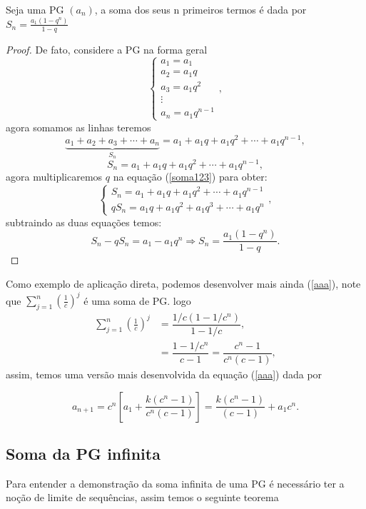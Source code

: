 \begin{teo}
\label{teoPG}
Seja uma PG $(a_n)$, a soma dos seus n primeiros termos é dada por $\displaystyle S_n = \frac{a_1(1-q^{n})}{1-q}$
\end{teo}
\begin{proof}
De fato, considere a PG na forma geral
\begin{equation}
    \begin{cases}
    a_1 = a_1\\
    a_2 = a_1q\\
    a_3 = a_1q^2\\
    \vdots\\
    a_n = a_1q^{n-1}
    \end{cases},
\end{equation}
agora somamos as linhas teremos
$$\underbrace{a_1 + a_2 + a_3 + \cdots + a_n}_{S_n} = a_1 + a_1q + a_1q^2 + \cdots +a_1q^{n-1},$$
\begin{equation}
\label{soma123}
S_n = a_1 + a_1q + a_1q^2 + \cdots + a_1q^{n-1},
\end{equation}
agora multiplicaremos $q$ na equação (\ref{soma123}) para obter:
\begin{equation}
    \begin{cases}
    S_n = a_1 + a_1q + a_1q^2 + \cdots + a_1q^{n-1}\\
    qS_n = a_1q + a_1q^2 + a_1q^3 + \cdots + a_1q^{n}
    \end{cases},
\end{equation}
subtraindo as duas equações temos:
$$S_n - qS_n = a_1 - a_1q^n \Rightarrow S_n =  \frac{a_1(1-q^{n})}{1-q}.$$
\end{proof}
Como exemplo de aplicação direta, podemos desenvolver mais ainda  (\ref{aaa}), note que $\sum_{j=1}^{n}\left(\frac{1}{c}\right)^j$ é uma soma de PG. logo
\begin{align}
    \sum_{j=1}^{n}\left(\frac{1}{c}\right)^j &= \dfrac{1/c(1-1/c^n)}{1-1/c},\\
    &= \dfrac{1 - 1/c^n}{c-1} = \dfrac{c^n-1}{c^n(c-1)},
\end{align}
assim, temos uma versão mais desenvolvida da equação (\ref{aaa}) dada por

\begin{equation}
    a_{n+1} = c^n\left[a_1 + \dfrac{k(c^n-1)}{c^n(c-1)}\right] = \dfrac{k(c^n-1)}{(c-1)} + a_1c^n.
\end{equation}


\subsection{Soma da PG infinita}
\inic Para entender a demonstração da soma infinita de uma PG é necessário ter a noção de limite de sequências, assim temos o seguinte teorema

